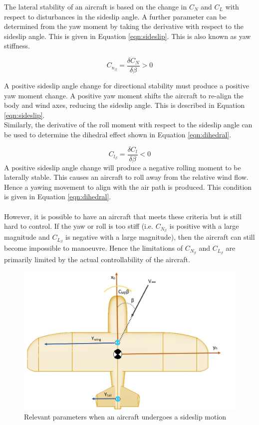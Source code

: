 The lateral stability of an aircraft is based on the change in $C_N$ and $C_L$ with respect to disturbances in the sideslip angle. A further parameter can be determined from the yaw moment by taking the derivative with respect to the sideslip angle. This is given in Equation \ref{eqn:sideslip}. This is also known as yaw stiffness.

\begin{equation}
    C_{n_\beta} = \frac{\delta C_N}{\delta \beta} > 0
    \label{eqn:sideslip}
\end{equation}


A positive sideslip angle change for directional stability must produce a positive yaw moment change. A positive yaw moment shifts the aircraft to re-align the body and wind axes, reducing the sideslip angle. This is described in Equation \ref{eqn:sideslip}. \\

Similarly, the derivative of the roll moment with respect to the sideslip angle can be used to determine the dihedral effect shown in Equation \ref{eqn:dihedral}.

\begin{equation}
    C_{l_\beta} = \frac{\delta C_l}{\delta \beta} < 0
    \label{eqn:dihedral}
\end{equation}
A positive sideslip angle change will produce a negative rolling moment to be laterally stable. This causes an aircraft to roll away from the relative wind flow. Hence a yawing movement to align with the air path is produced. This condition is given in Equation \ref{eqn:dihedral}. \\ 
\\
However, it is possible to have an aircraft that meets these criteria but is still hard to control. If the yaw or roll is too stiff (i.e. $C_{N_\beta}$ is positive with a large magnitude and $C_{L_\beta}$ is negative with a large magnitude), then the aircraft can still become impossible to manoeuvre. Hence the limitations of $C_{N_\beta}$ and $C_{L_\beta}$ are primarily limited by the actual controllability of the aircraft. 




\begin{figure}[H]
  \centering
   \includegraphics[width=0.8\linewidth]{03_LiteratureReview/Figs/sideslip.JPG}
  \caption{Relevant parameters when an aircraft undergoes a sideslip motion}
  \label{fig:sideslip}
\end{figure}

